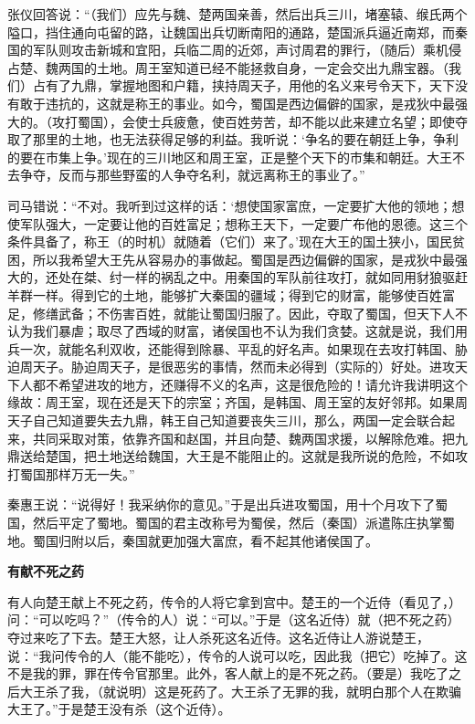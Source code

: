 \documentclass[12pt,UTF-8,openany,a4]{ctexbook}
\begin{document}
\begin{large}
    张仪回答说：“（我们）应先与魏、楚两国亲善，然后出兵三川，堵塞辕、缑氏两个隘口，挡住通向屯留的路，让魏国出兵切断南阳的通路，楚国派兵逼近南郑，而秦国的军队则攻击新城和宜阳，兵临二周的近郊，声讨周君的罪行，（随后）乘机侵占楚、魏两国的土地。周王室知道已经不能拯救自身，一定会交出九鼎宝器。（我们）占有了九鼎，掌握地图和户籍，挟持周天子，用他的名义来号令天下，天下没有敢于违抗的，这就是称王的事业。如今，蜀国是西边偏僻的国家，是戎狄中最强大的。（攻打蜀国），会使士兵疲惫，使百姓劳苦，却不能以此来建立名望；即使夺取了那里的土地，也无法获得足够的利益。我听说：‘争名的要在朝廷上争，争利的要在市集上争。’现在的三川地区和周王室，正是整个天下的市集和朝廷。大王不去争夺，反而与那些野蛮的人争夺名利，就远离称王的事业了。”
    
    司马错说：“不对。我听到过这样的话：‘想使国家富庶，一定要扩大他的领地；想使军队强大，一定要让他的百姓富足；想称王天下，一定要广布他的恩德。这三个条件具备了，称王（的时机）就随着（它们）来了。’现在大王的国土狭小，国民贫困，所以我希望大王先从容易办的事做起。蜀国是西边偏僻的国家，是戎狄中最强大的，还处在桀、纣一样的祸乱之中。用秦国的军队前往攻打，就如同用豺狼驱赶羊群一样。得到它的土地，能够扩大秦国的疆域；得到它的财富，能够使百姓富足，修缮武备；不伤害百姓，就能让蜀国归服了。因此，夺取了蜀国，但天下人不认为我们暴虐；取尽了西域的财富，诸侯国也不认为我们贪婪。这就是说，我们用兵一次，就能名利双收，还能得到除暴、平乱的好名声。如果现在去攻打韩国、胁迫周天子。胁迫周天子，是很恶劣的事情，然而未必得到（实际的）好处。进攻天下人都不希望进攻的地方，还赚得不义的名声，这是很危险的！请允许我讲明这个缘故：周王室，现在还是天下的宗室；齐国，是韩国、周王室的友好邻邦。如果周天子自己知道要失去九鼎，韩王自己知道要丧失三川，那么，两国一定会联合起来，共同采取对策，依靠齐国和赵国，并且向楚、魏两国求援，以解除危难。把九鼎送给楚国，把土地送给魏国，大王是不能阻止的。这就是我所说的危险，不如攻打蜀国那样万无一失。”
    
    秦惠王说：“说得好！我采纳你的意见。”于是出兵进攻蜀国，用十个月攻下了蜀国，然后平定了蜀地。蜀国的君主改称号为蜀侯，然后（秦国）派遣陈庄执掌蜀地。蜀国归附以后，秦国就更加强大富庶，看不起其他诸侯国了。
    
    \begin{center}{\Large\textbf{有献不死之药}}\end{center}
    
    有人向楚王献上不死之药，传令的人将它拿到宫中。楚王的一个近侍（看见了，）问：“可以吃吗？”（传令的人）说：“可以。”于是（这名近侍）就（把不死之药）夺过来吃了下去。楚王大怒，让人杀死这名近侍。这名近侍让人游说楚王，说：“我问传令的人（能不能吃），传令的人说可以吃，因此我（把它）吃掉了。这不是我的罪，罪在传令官那里。此外，客人献上的是不死之药。（要是）我吃了之后大王杀了我，（就说明）这是死药了。大王杀了无罪的我，就明白那个人在欺骗大王了。”于是楚王没有杀（这个近侍）。
    
\end{large}
\end{document}
